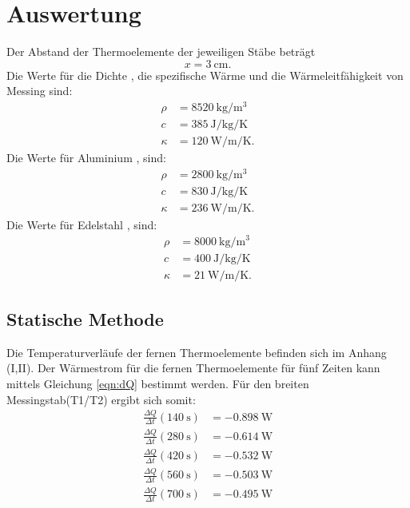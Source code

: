 \section{Auswertung}
\label{sec:Auswertung}
Der Abstand der Thermoelemente der jeweiligen Stäbe beträgt
\begin{equation*}
    x = \SI{3}{\centi\meter}.
\end{equation*}
Die Werte für die Dichte \cite{V204}, die spezifische Wärme \cite{V204} und 
die Wärmeleitfähigkeit \cite{wiki} von Messing sind: 
\begin{align*}
    \rho &= \SI{8520}{\kilo\gram\per\cubic\meter} \\
    c &= \SI{385}{\joule\per\kilo\gram\per\kelvin} \\
    \kappa &= \SI{120}{\watt\per\meter\per\kelvin}.
\end{align*}
Die Werte für Aluminium \cite{V204}, \cite{wiki} sind:
\begin{align*}
    \rho &= \SI{2800}{\kilo\gram\per\cubic\meter} \\
    c &= \SI{830}{\joule\per\kilo\gram\per\kelvin} \\
    \kappa &= \SI{236}{\watt\per\meter\per\kelvin}.
\end{align*}
Die Werte für Edelstahl \cite{V204}, \cite{edelstahl} sind:
\begin{align*}
    \rho &= \SI{8000}{\kilo\gram\per\cubic\meter} \\
    c &= \SI{400}{\joule\per\kilo\gram\per\kelvin} \\
    \kappa &= \SI{21}{\watt\per\meter\per\kelvin}.
\end{align*}

\subsection{Statische Methode}
Die Temperaturverläufe der fernen Thermoelemente
befinden sich im Anhang (I,II).
\newline
Der Wärmestrom für die fernen Thermoelemente für fünf Zeiten kann mittels
Gleichung \ref{eqn:dQ} bestimmt werden.
Für den breiten Messingstab(T1/T2) ergibt sich somit:
\begin{align*} %
   \frac{\Delta Q}{\Delta t}(\SI{140}{\second}) &= \SI{-0.898}{\watt} \\ 
   \frac{\Delta Q}{\Delta t}(\SI{280}{\second}) &= \SI{-0.614}{\watt} \\ 
   \frac{\Delta Q}{\Delta t}(\SI{420}{\second}) &= \SI{-0.532}{\watt} \\ 
   \frac{\Delta Q}{\Delta t}(\SI{560}{\second}) &= \SI{-0.503}{\watt} \\ 
   \frac{\Delta Q}{\Delta t}(\SI{700}{\second}) &= \SI{-0.495}{\watt} \\ 
\end{align*}


